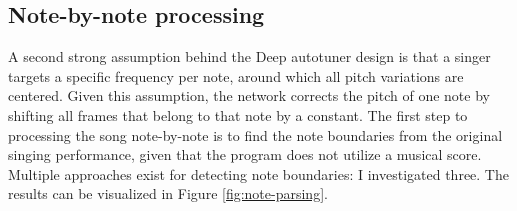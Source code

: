 \subsection{Note-by-note processing}
\label{ref:notes}
A second strong assumption behind the Deep autotuner design is that a singer targets a specific frequency per note, around which all pitch variations are centered. Given this assumption, the network corrects the pitch of one note by shifting all frames that belong to that note by a constant. The first step to processing the song note-by-note is to find the note boundaries from the original singing performance, given that the program does not utilize a musical score. Multiple approaches exist for detecting note boundaries: I investigated three. The results can be visualized in Figure \ref{fig:note-parsing}.

